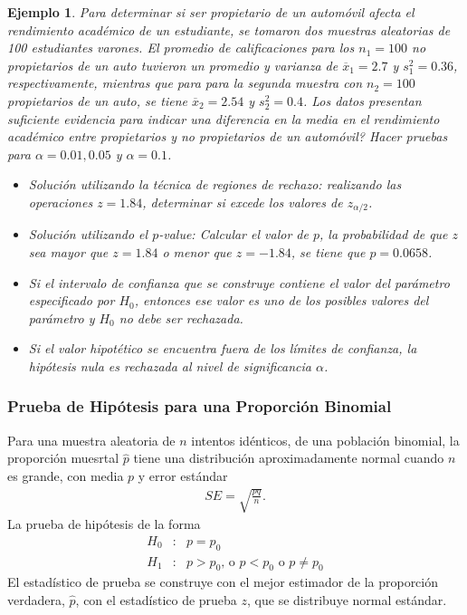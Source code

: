 \documentclass[a4paper]{report} %
\newtheorem{Ejem}{Ejemplo}[chapter]
\begin{document}
\begin{Ejem}
Para determinar si ser propietario de un autom\'ovil afecta el rendimiento acad\'emico de un estudiante, se tomaron dos muestras aleatorias de 100 estudiantes varones. El promedio de calificaciones para los $n_{1}=100$ no propietarios de un auto tuvieron un promedio y varianza de $\overline{x}_{1}=2.7$ y $s_{1}^{2}=0.36$, respectivamente, mientras que para para la segunda muestra con $n_{2}=100$ propietarios de un auto, se tiene $\overline{x}_{2}=2.54$ y $s_{2}^{2}=0.4$. Los datos presentan suficiente evidencia para indicar una diferencia en la media en el rendimiento acad\'emico entre propietarios y no propietarios de un autom\'ovil? Hacer pruebas para $\alpha=0.01,0.05$ y $\alpha=0.1$.

\begin{itemize}
\item Soluci\'on utilizando la t\'ecnica de regiones de rechazo:\medskip
realizando las operaciones
$z=1.84$, determinar si excede los valores de $z_{\alpha/2}$.
\item Soluci\'on utilizando el $p$-value:\medskip
Calcular el valor de $p$, la probabilidad de que $z$ sea mayor que $z=1.84$ o menor que $z=-1.84$, se tiene que $p=0.0658$. 

\item Si el intervalo de confianza que se construye contiene el valor del par\'ametro especificado por $H_{0}$, entonces ese valor es uno de los posibles valores del par\'ametro y $H_{0}$ no debe ser rechazada.

\item Si el valor hipot\'etico se encuentra fuera de los l\'imites de confianza, la hip\'otesis nula es rechazada al nivel de significancia $\alpha$.
\end{itemize}
\end{Ejem}

\subsubsection*{Prueba de Hip\'otesis para una Proporci\'on Binomial}

Para una muestra aleatoria de $n$ intentos id\'enticos, de una poblaci\'on binomial, la proporci\'on muesrtal $\hat{p}$ tiene una distribuci\'on aproximadamente normal cuando $n$ es grande, con media $p$ y error est\'andar
\begin{eqnarray}SE=\sqrt{\frac{pq}{n}}.\end{eqnarray}
La prueba de hip\'otesis de la forma
\begin{eqnarray*}
H_{0}&:&p=p_{0}\\
H_{1}&:&p>p_{0}\textrm{, o }p<p_{0}\textrm{ o }p\neq p_{0}
\end{eqnarray*}
El estad\'istico de prueba se construye con el mejor estimador de la proporci\'on verdadera, $\hat{p}$, con el estad\'istico de prueba $z$, que se distribuye normal est\'andar.
\end{document}
